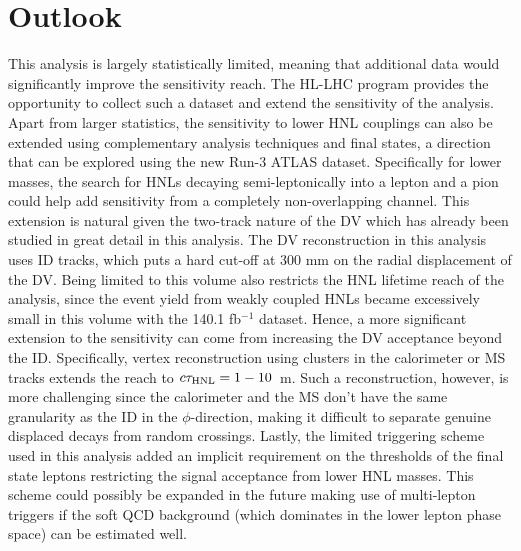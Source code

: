 \section*{Outlook}
This analysis is largely statistically limited, meaning that additional data would significantly improve the sensitivity reach. The HL-LHC program provides the opportunity to collect such a dataset and extend the sensitivity of the analysis. Apart from larger statistics, the sensitivity to lower HNL couplings can also be extended using complementary analysis techniques and final states, a direction that can be explored using the new Run-3 ATLAS dataset. Specifically for lower masses, the search for HNLs decaying semi-leptonically into a lepton and a pion could help add sensitivity from a completely non-overlapping channel. This extension is natural given the two-track nature of the DV which has already been studied in great detail in this analysis. The DV reconstruction in this analysis uses ID tracks, which puts a hard cut-off at 300 mm on the radial displacement of the DV. Being limited to this volume also restricts the HNL lifetime reach of the analysis, since the event yield from weakly coupled HNLs became excessively small in this volume with the 140.1 fb$^{-1}$ dataset. Hence, a more significant extension to the sensitivity can come from increasing the DV acceptance beyond the ID. Specifically, vertex reconstruction using clusters in the calorimeter or MS tracks extends the reach to $c\tau_\mathrm{HNL}=1-10$~m. Such a reconstruction, however, is more challenging since the calorimeter and the MS don't have the same granularity as the ID in the $\phi$-direction, making it difficult to separate genuine displaced decays from random crossings. Lastly, the limited triggering scheme used in this analysis added an implicit requirement on the \pT thresholds of the final state leptons restricting the signal acceptance from lower HNL masses. This scheme could possibly be expanded in the future making use of multi-lepton triggers if the soft QCD background (which dominates in the lower lepton \pT phase space) can be estimated well.
